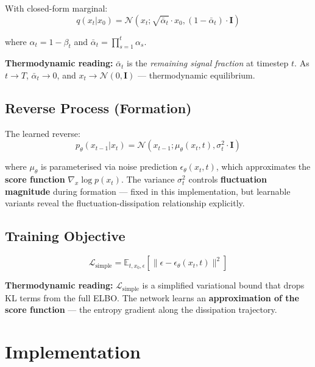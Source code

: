 \documentclass{article}
\begin{document}
With closed-form marginal:
\begin{equation}
q(x_t | x_0) = \mathcal{N}(x_t; \sqrt{\bar{\alpha}_t} \cdot x_0, (1 - \bar{\alpha}_t) \cdot \mathbf{I})
\end{equation}

where $\alpha_t = 1 - \beta_t$ and $\bar{\alpha}_t = \prod_{s=1}^{t} \alpha_s$.

\textbf{Thermodynamic reading:} $\bar{\alpha}_t$ is the \textit{remaining signal fraction} at timestep $t$. As $t \to T$, $\bar{\alpha}_t \to 0$, and $x_t \to \mathcal{N}(0, \mathbf{I})$ --- thermodynamic equilibrium.

\subsection{Reverse Process (Formation)}

The learned reverse:
\begin{equation}
p_\theta(x_{t-1} | x_t) = \mathcal{N}(x_{t-1}; \mu_\theta(x_t, t), \sigma_t^2 \cdot \mathbf{I})
\end{equation}

where $\mu_\theta$ is parameterised via noise prediction $\epsilon_\theta(x_t, t)$, which approximates the \textbf{score function} $\nabla_x \log p(x_t)$. The variance $\sigma_t^2$ controls \textbf{fluctuation magnitude} during formation --- fixed in this implementation, but learnable variants reveal the fluctuation-dissipation relationship explicitly.

\subsection{Training Objective}

\begin{equation}
\mathcal{L}_{\text{simple}} = \mathbb{E}_{t, x_0, \epsilon} \left[ \| \epsilon - \epsilon_\theta(x_t, t) \|^2 \right]
\end{equation}

\textbf{Thermodynamic reading:} $\mathcal{L}_{\text{simple}}$ is a simplified variational bound that drops KL terms from the full ELBO. The network learns an \textbf{approximation of the score function} --- the entropy gradient along the dissipation trajectory.

\section{Implementation}
\end{document}
